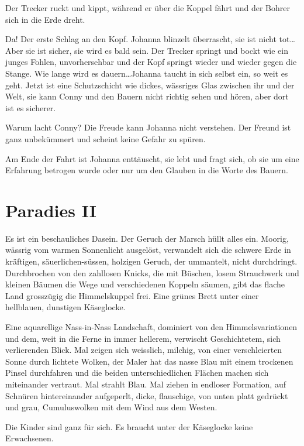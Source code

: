 Der Trecker ruckt und kippt, während er über die Koppel fährt und der Bohrer sich in die Erde dreht.

Da! Der erste Schlag an den Kopf. Johanna blinzelt überrascht, sie ist nicht tot\dots Aber sie ist sicher, sie wird es bald sein. Der Trecker springt und bockt wie ein junges Fohlen, unvorhersehbar und der Kopf springt wieder und wieder gegen die Stange. Wie lange wird es dauern\dots Johanna taucht in sich selbst ein, so weit es geht. Jetzt ist eine Schutzschicht wie dickes, wässriges Glas zwischen ihr und der Welt, sie kann Conny und den Bauern nicht richtig sehen und hören, aber dort ist es sicherer.

Warum lacht Conny? Die Freude kann Johanna nicht verstehen. Der Freund ist ganz unbekümmert und scheint keine Gefahr zu spüren.

Am Ende der Fahrt ist Johanna enttäuscht, sie lebt und fragt sich, ob sie um eine Erfahrung betrogen wurde oder nur um den Glauben in die Worte des Bauern.



\section*{Paradies II}



Es ist ein beschauliches Dasein. Der Geruch der Marsch hüllt alles ein. Moorig, wässrig vom warmen Sonnenlicht ausgelöst, verwandelt sich die schwere Erde in kräftigen, säuerlichen-süssen, holzigen Geruch, der ummantelt, nicht durchdringt. Durchbrochen von den zahllosen Knicks, die mit Büschen, losem Strauchwerk und kleinen Bäumen die Wege und verschiedenen Koppeln säumen, gibt das flache Land grosszügig die Himmelskuppel frei. Eine grünes Brett unter einer hellblauen, dunstigen Käseglocke. 

Eine aquarellige Nass-in-Nass Landschaft, dominiert von den Himmelsvariationen und dem, weit in die Ferne in immer hellerem, verwischt Geschichtetem, sich verlierenden Blick. Mal zeigen sich weisslich, milchig, von einer verschleierten Sonne durch lichtete Wolken, der Maler hat das nasse Blau mit einem trockenen Pinsel durchfahren und die beiden unterschiedlichen Flächen machen sich miteinander vertraut. Mal strahlt Blau. Mal ziehen in endloser Formation, auf Schnüren hintereinander aufgeperlt, dicke, flauschige,  von unten platt gedrückt und grau, Cumuluswolken mit dem Wind aus dem Westen.

Die Kinder sind ganz für sich. Es braucht unter der Käseglocke keine Erwachsenen. 

